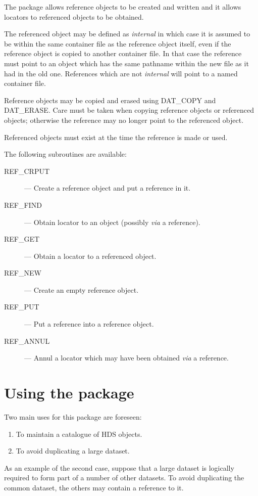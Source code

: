 \documentclass[twoside,11pt]{article}
\newcommand{\xlabel}[1]{}
\begin{document}
The package allows reference objects to be created and written and it
allows locators to referenced objects to be obtained.

The referenced object may be defined as \emph{internal\/} in which case
it is assumed to be within the same container file as the reference
object itself, even if the reference object is copied to another
container file.  In that case the reference must point to an object
which has the same pathname within the new file as it had in the old
one.  References which are not \emph{internal\/} will point to a named
container file.

Reference objects may be copied and erased using DAT\_COPY and
DAT\_ERASE\@.  Care must be taken when copying reference objects or
referenced objects; otherwise the reference may no longer point to the
referenced object.

Referenced objects must exist at the time the reference is made or used.

The following subroutines are available:
\begin{description}
\item [REF\_CRPUT] --- Create a reference object and put a reference in it.
\item [REF\_FIND] --- Obtain locator to an object (possibly \emph{via} a
reference).
\item [REF\_GET] --- Obtain a locator to a referenced object.
\item [REF\_NEW] --- Create an empty reference object.
\item [REF\_PUT] --- Put a reference into a reference object.
\item [REF\_ANNUL] --- Annul a locator which may have been obtained
\emph{via} a reference.
\end{description}

\section{\xlabel{using_the_package}Using the package}
\label{using_the_package}

Two main uses for this package are foreseen:

\begin{enumerate}
\item To maintain a catalogue of HDS objects.
\item To avoid duplicating a large dataset.
\end{enumerate}

As an example of the second case, suppose that a large dataset is
logically required to form part of a number of other datasets.  To
avoid duplicating the common dataset, the others may contain a
reference to it.
\end{document}
